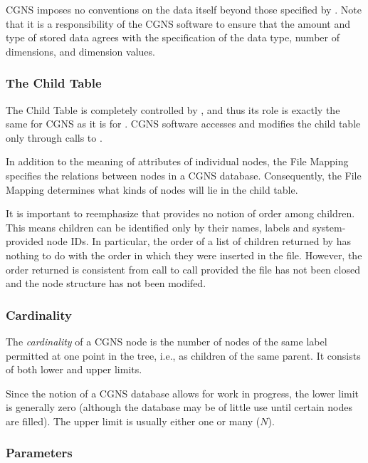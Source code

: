 CGNS imposes no conventions on the data itself beyond those specified
by \HDF. Note that it is a responsibility of the CGNS software to ensure
that the amount and type of stored data agrees with the specification of
the data type, number of dimensions, and dimension values.

\subsubsection{The Child Table}
\label{s:childtable}

The Child Table is completely controlled by \HDF, and thus its role is
exactly the same for CGNS as it is for \HDF. CGNS software accesses and
modifies the child table only through calls to \HDF.

In addition to the meaning of attributes of individual \HDF nodes,
the File Mapping specifies the relations between nodes in a CGNS
database. Consequently, the File Mapping determines what kinds of nodes
will lie in the child table.

%
It is important to reemphasize that \HDF provides no notion of order
among children. This means children can be identified only by their
names, labels and system-provided node IDs. In particular, the order
of a list of children returned by \HDF has nothing to do with the order
in which they were inserted in the file. However, the order returned is
consistent from call to call provided the file has not been closed and
the node structure has not been modifed.
%

\subsubsection{Cardinality}
\label{s:cardinality}

The \emph{cardinality} of a CGNS node is the number of nodes of the same
label permitted at one point in the tree, i.e., as children of the same
parent. It consists of both lower and upper limits.

Since the notion of a CGNS database allows for work in progress, the
lower limit is generally zero (although the database may be of little
use until certain nodes are filled). The upper limit is usually either
one or many ($N$).

\subsubsection{Parameters}

